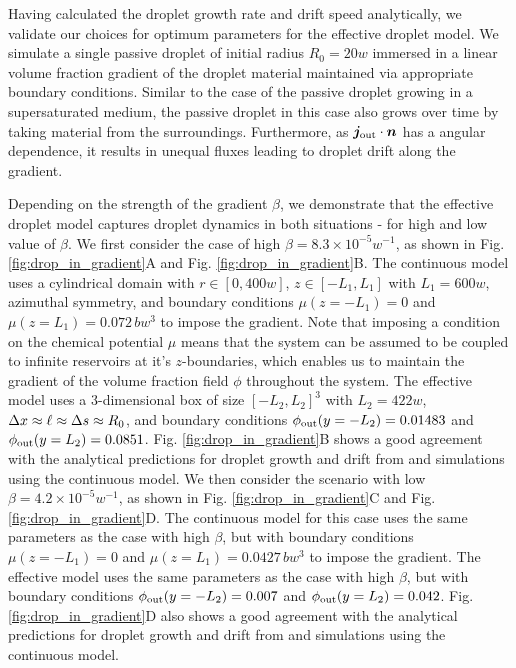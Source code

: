 Having calculated the droplet growth rate and drift speed  analytically, we validate our choices for optimum parameters for the effective droplet model. 
We simulate a single passive droplet of initial radius $R_0 = 20w$ immersed in a linear volume fraction gradient of the droplet material maintained via appropriate boundary conditions. 
Similar to the case of the passive droplet growing in a supersaturated medium, the passive droplet in this case also grows over time by taking material from the surroundings. 
Furthermore, as $\boldsymbol{j}_\mathrm{out} \cdot \boldsymbol{n}$ has a angular dependence, it results in unequal fluxes leading to droplet drift along the gradient.

Depending on the strength of the gradient $\beta$, we demonstrate that the effective droplet model captures droplet dynamics in both situations - for high and low value of $\beta$.
We first consider the case of high $\beta = 8.3 \times 10^{-5} w^{-1}$, as shown in Fig. \ref{fig:drop_in_gradient}A and Fig. \ref{fig:drop_in_gradient}B.
The continuous model uses a cylindrical domain with $r \in [0, 400 w]$, $z\in [-L_1, L_1]$ with $L_1=600 w$, azimuthal symmetry, and boundary conditions $\mu(z=-L_1) = 0$ and $\mu(z=L_1)= 0.072\,b w^3$ to impose the gradient.
Note that imposing a condition on the chemical potential $\mu$ means that the system can be assumed to be coupled to infinite reservoirs at it's $z$-boundaries, which enables us to maintain the gradient of the volume fraction field $\phi$ throughout the system. 
The effective model uses a $3$-dimensional box of size $[-L_2, L_2]^3$ with $L_2 = 422 w$, $\Delta x \approx \ell \approx \Delta s \approx R_0$, and boundary conditions $\phi_\mathrm{out}(y = -L_2) = 0.01483$ and $\phi_\mathrm{out}(y = L_2) = 0.0851$.
Fig. \ref{fig:drop_in_gradient}B shows a good agreement with the analytical predictions for droplet growth and drift from  and simulations using the continuous model.
We then consider the scenario with low $\beta = 4.2 \times 10^{-5} w^{-1}$, as shown in Fig. \ref{fig:drop_in_gradient}C and Fig. \ref{fig:drop_in_gradient}D.
The continuous model for this case uses the same parameters as the case with high $\beta$, but with boundary conditions $\mu(z=-L_1) = 0$ and $\mu(z=L_1)= 0.0427\,b w^3$ to impose the gradient.
The effective model uses the same parameters as the case with high $\beta$, but with boundary conditions $\phi_\mathrm{out}(y = -L_2) = 0.007$  and $\phi_\mathrm{out}(y = L_2) =  0.042$.
Fig. \ref{fig:drop_in_gradient}D also shows a good agreement with the analytical predictions for droplet growth and drift from  and simulations using the continuous model.


